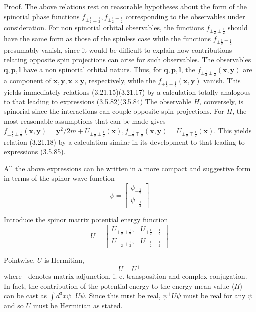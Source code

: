 \documentclass{article}
\begin{document}
Proof. The above relations rest on reasonable hypotheses about the form of the spinorial phase functions $f_{ \pm \frac{1}{2} \pm \frac{1}{2}}, f_{ \pm \frac{1}{2} \mp \frac{1}{2}}$ corresponding to the observables under consideration. For non spinorial orbital observables, the functions $f_{ \pm \frac{1}{2} \pm \frac{1}{2}}$ should have the
same form as those of the spinless case while the functions $f_{ \pm \frac{1}{2} \mp \frac{1}{2}}$ presumably vanish, since it would be difficult to explain how contributions relating opposite spin projections can arise for such observables. The observables $\boldsymbol{q}, \boldsymbol{p}, \boldsymbol{l}$ have a non spinorial orbital nature. Thus, for $\boldsymbol{q}, \boldsymbol{p}, \boldsymbol{l}$, the $f_{ \pm \frac{1}{2} \pm \frac{1}{2}}(\boldsymbol{x}, \boldsymbol{y})$ are a component of $\boldsymbol{x}, \boldsymbol{y}, \boldsymbol{x} \times \boldsymbol{y}$, respectively, while the $f_{ \pm \frac{1}{2} \mp \frac{1}{2}}(\boldsymbol{x}, \boldsymbol{y})$ vanish. This yields immediately relations (3.21.15)(3.21.17) by a calculation totally analogous to that leading to expressions (3.5.82)(3.5.84) The observable $H$, conversely, is spinorial since the interactions can couple opposite spin projections. For $H$, the most reasonable assumptions that can be made gives $f_{ \pm \frac{1}{2} \pm \frac{1}{2}}(\boldsymbol{x}, \boldsymbol{y})=\boldsymbol{y}^{2} / 2 m+U_{ \pm \frac{1}{2} \pm \frac{1}{2}}(\boldsymbol{x}), f_{ \pm \frac{1}{2} \mp \frac{1}{2}}(\boldsymbol{x}, \boldsymbol{y})=U_{ \pm \frac{1}{2} \mp \frac{1}{2}}(\boldsymbol{x})$. This yields relation (3.21.18) by a calculation similar in its development to that leading to expressions (3.5.85).

All the above expressions can be written in a more compact and suggestive form in terms of the spinor wave function
$$
\psi=\left[\begin{array}{l}
\psi_{+\frac{1}{2}}  \tag{3.21.19}\\
\psi_{-\frac{1}{2}}
\end{array}\right]
$$

Introduce the spinor matrix potential energy function
$$
U=\left[\begin{array}{ll}
U_{+\frac{1}{2}+\frac{1}{2}}, & U_{+\frac{1}{2}-\frac{1}{2}}  \tag{3.21.20}\\
U_{-\frac{1}{2}+\frac{1}{2}}, & U_{-\frac{1}{2}-\frac{1}{2}}
\end{array}\right]
$$

Pointwise, $U$ is Hermitian,
$$
\begin{equation*}
U=U^{+} \tag{3.21.21}
\end{equation*}
$$
where ${ }^{+}$denotes matrix adjunction, i. e. transposition and complex conjugation. In fact, the contribution of the potential energy to the energy mean value $\langle H\rangle$ can be cast as $\int d^{3} x \psi^{+} U \psi$. Since this must be real, $\psi^{+} U \psi$ must be real for any $\psi$ and so $U$ must be Hermitian as stated.
\end{document}
